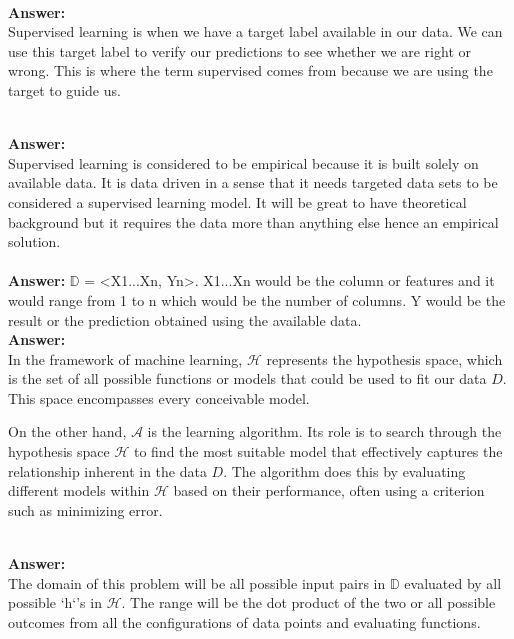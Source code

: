 \documentclass[12pt]{article}
\begin{document}
\begin{enumerate}
\\
\textbf{Answer: } \\ 
Supervised learning is when we have a target label available in our data. We can use this target label to verify our predictions to see whether we are right or wrong. This is where the term supervised comes from because we are using the target to guide us. 

\\ 
\textbf{Answer: } \\ 
Supervised learning is considered to be empirical because it is built solely on available data. It is data driven in a sense that it needs targeted data sets to be considered a supervised learning model. It will be great to have theoretical background but it requires the data more than anything else hence an empirical solution. \\ 

\\
\textbf{Answer: }
 $\mathbb{D}$ = <X1...Xn, Yn>. X1...Xn would be the column or features and it would range from 1 to n which would be the number of columns. Y would be the result or the prediction obtained using the available data.
 \\ 
\textbf{Answer: } \\ 
In the framework of machine learning, \( \mathcal{H} \) represents the hypothesis space, which is the set of all possible functions or models that could be used to fit our data \( D \). This space encompasses every conceivable model.

On the other hand, \( \mathcal{A} \) is the learning algorithm. Its role is to search through the hypothesis space \( \mathcal{H} \) to find the most suitable model that effectively captures the relationship inherent in the data \( D \). The algorithm does this by evaluating different models within \( \mathcal{H} \) based on their performance, often using a criterion such as minimizing error.

 \\ 
\textbf{Answer: } \\ 
The domain of this problem will be all possible input pairs in $\mathbb{D}$ evaluated by all possible `h`'s in $ \mathcal{H}$. The range will be the dot product of the two or all possible outcomes from all the configurations of data points and evaluating functions.


\end{enumerate}
\end{document}
